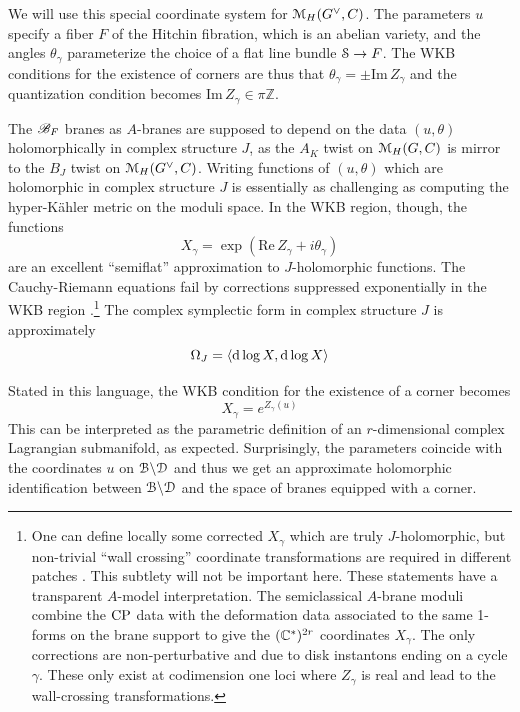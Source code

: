 \documentclass[11pt,a4paper]{article}
\begin{document}
We will use this special coordinate system for $\M_H(G^\vee,C)$. The parameters $u$ specify a fiber $F$ of the Hitchin fibration, which is an abelian
variety, and the angles $\theta_\gamma$ parameterize 
the choice of a flat line bundle $\S\to F$. The WKB conditions for the existence of corners are thus that $\theta_\gamma = \pm \mathrm{Im}\,Z_\gamma$ 
and the quantization condition becomes $\mathrm{Im}\, Z_\gamma \in \pi \mathbb{Z}$.

The $\B_F$ branes as $A$-branes are supposed to depend on the data $(u, \theta)$ holomorphically in complex structure $J$, 
as the $A_K$ twist on $\M_H(G,C)$ is mirror to the $B_J$ twist on $\M_H(G^\vee,C)$. Writing functions of $(u, \theta)$ which are holomorphic in complex structure $J$ is essentially as challenging as computing the hyper-K\"ahler metric on the moduli space. In the WKB region, though, 
the functions 
\begin{equation} \label{eq:semiflat}
X_\gamma = \exp \left(\mathrm{Re}\,Z_\gamma + i \theta_\gamma \right)
\end{equation}
 are an excellent ``semiflat'' approximation to $J$-holomorphic functions. The Cauchy-Riemann equations fail by corrections suppressed exponentially in the WKB region \cite{Gaiotto:2008cd}.\footnote{One can define locally some corrected $X_\gamma$ which are truly $J$-holomorphic, but non-trivial ``wall crossing'' coordinate transformations are required in different patches
 \cite{GMN}. This subtlety will not be important here. These statements  have a transparent $A$-model interpretation. The semiclassical $A$-brane  moduli combine the $\CP$ data with the deformation data associated to the same 1-forms on the brane support to give the $(\C^*)^{2r}$ coordinates $X_\gamma$. The only corrections are non-perturbative and due to disk instantons ending on a cycle $\gamma$. These only exist at codimension one loci where $Z_\gamma$ is real 
and lead to the wall-crossing transformations. } The complex symplectic form in complex structure $J$ is approximately 
\begin{equation}
\Omega_J = \langle \d \log X, \d \log X \rangle
\end{equation}

Stated in this language, the WKB condition for the existence of a corner becomes
\begin{equation} \label{eq:wkb}
X_\gamma = e^{Z_\gamma(u)}
\end{equation}
This can be interpreted as the parametric definition of an $r$-dimensional complex Lagrangian submanifold, as expected. 
Surprisingly, the parameters coincide with the coordinates $u$ on ${\cal B}\backslash{\cal D}$ and thus we get an approximate holomorphic identification 
between ${\cal B}\backslash{\cal D}$ and the space of branes equipped with a corner. 
\end{document}
